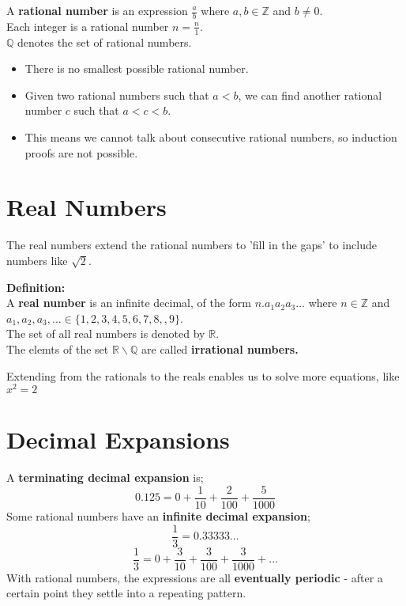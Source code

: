 \documentclass{report}
\newenvironment{frameblue}[1][BlueViolet]
  {\begin{tcolorbox}[colframe=#1,colback=white]}
  {\end{tcolorbox}}
\begin{document}
A \textbf{rational number} is an expression $\frac{a}{b}$ where $a,b \in \mathbb{Z}$ and $b \neq 0$.\\

Each integer is a rational number $n = \frac{n}{1}$.\\

$\mathbb{Q}$ denotes the set of rational numbers.\\

\begin{itemize}
    \item There is no smallest possible rational number.
    \item Given two rational numbers such that $a < b$, we can find another rational number $c$ such that $a < c < b$.
    \item This means we cannot talk about consecutive rational numbers, so induction proofs are not possible.
\end{itemize}

\section{Real Numbers}

The real numbers extend the rational numbers to 'fill in the gaps' to include numbers like $\sqrt{2}$.\\

\begin{frameblue}
    \textbf{Definition:}\\
    A \textbf{real number} is an infinite decimal, of the form $n.a_1a_2a_3...$ where $n \in \mathbb{Z}$ and $a_1,a_2,a_3,... \in \{1,2,3,4,5,6,7,8,,9\}$.\\
    The set of all real numbers is denoted by $\mathbb{R}$.\\
    The elemts of the set $\mathbb{R} \backslash \mathbb{Q}$ are called \textbf{irrational numbers.}
\end{frameblue}

Extending from the rationals to the reals enables us to solve more equations, like $x^2 = 2$

\section{Decimal Expansions}

A \textbf{terminating decimal expansion} is;
\begin{equation*}
    0.125 = 0 + \frac{1}{10} + \frac{2}{100} + \frac{5}{1000}
\end{equation*}
Some rational numbers have an \textbf{infinite decimal expansion};
\begin{equation*}
    \frac{1}{3} = 0.33333...
\end{equation*}
\begin{equation*}
    \frac{1}{3} = 0 + \frac{3}{10} + \frac{3}{100} + \frac{3}{1000} + ...
\end{equation*}
With rational numbers, the expressions are all \textbf{eventually periodic} - after a certain point they settle into a repeating pattern.\\
\end{document}
